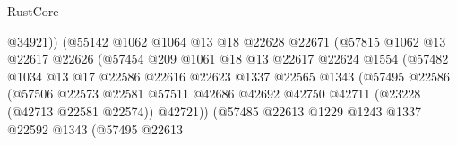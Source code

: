 \begin{lexlean}{RustCore}
\begin{coremodule}
                                        @34921))
                                    (@55142
                                      @1062
                                      @1064
                                      @13
                                      @18
                                      @22628
                                      @22671
                                      (@57815
                                        @1062
                                        @13
                                        @22617
                                        @22626
                                        (@57454
                                          @209
                                          @1061
                                          @18
                                          @13
                                          @22617
                                          @22624
                                          @1554
                                          (@57482
                                            @1034
                                            @13
                                            @17
                                            @22586
                                            @22616
                                            @22623
                                            @1337
                                            @22565
                                            @1343
                                            (@57495
                                              @22586
                                              (@57506
                                                @22573
                                                @22581
                                                @57511
                                                @42686
                                                @42692
                                                @42750
                                                @42711
                                                (@23228 (@42713 @22581 @22574))
                                                @42721))
                                            (@57485
                                              @22613
                                              @1229
                                              @1243
                                              @1337
                                              @22592
                                              @1343
                                              (@57495
                                                @22613

\end{coremodule}
\end{lexlean}
